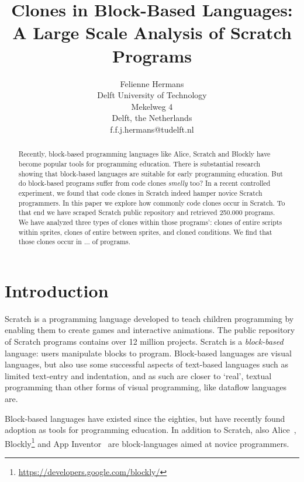 \documentclass[times,10pt,twocolumn]{article}
\begin{document}
   

\title{Clones in Block-Based Languages: A Large Scale Analysis of Scratch Programs}

\author{Felienne Hermans\\
       {Delft University of Technology}\\
      {Mekelweg 4}\\
       {Delft, the Netherlands}\\
       {f.f.j.hermans@tudelft.nl}
}

\maketitle



\begin{abstract}
Recently, block-based programming languages like Alice, Scratch and Blockly have become popular tools for programming education. There is substantial research showing that block-based languages are suitable for early programming education. But do block-based programs suffer from code clones \emph{smelly} too? In a recent controlled experiment, we found that code clones in Scratch indeed hamper novice Scratch programmers. In this paper we explore how commonly code clones occur in Scratch. To that end we have scraped Scratch public repository and retrieved 250.000 programs. We have analyzed three types of clones within those programs': clones of entire scripts within sprites, clones of entire between sprites, and cloned conditions. We find that those clones occur in ... of programs.
\end{abstract}

\section{Introduction}

Scratch is a programming language developed to teach children programming by enabling them to create games and interactive animations. The public repository of Scratch programs contains over 12 million projects. Scratch is a \emph{block-based} language: users manipulate blocks to program. Block-based languages are visual languages, but also use some successful aspects of text-based languages such as limited text-entry and indentation, and as such are closer to `real', textual programming than other forms of visual programming, like dataflow languages are.

Block-based languages have existed since the eighties, but have recently found adoption as tools for programming education. In addition to Scratch, also Alice~\cite{conway_alice:_1994}, Blockly\footnote{\url{https://developers.google.com/blockly/}} and App Inventor~\cite{wolber_app_2011} are block-languages aimed at novice programmers.
\end{document}
